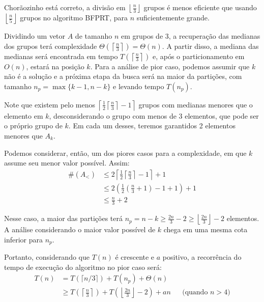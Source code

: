 Chorãozinho está correto, a divisão em $\left\lfloor\frac{n}{3}\right\rfloor$ grupos é menos eficiente que usando $\left\lfloor\frac{n}{5}\right\rfloor$ grupos no algoritmo BFPRT, para $n$ suficientemente grande.

\itemdsep{}

Dividindo um vetor $A$ de tamanho $n$ em grupos de 3, a recuperação das medianas dos grupos terá complexidade $\Theta(\left\lceil\frac{n}{3}\right\rceil) = \Theta(n)$. A partir disso, a mediana das medianas será encontrada em tempo $T(\left\lceil\frac{n}{3}\right\rceil)$ e, após o particionamento em $O(n)$, estará na posição $k$. Para a análise de pior caso, podemos assumir que $k$ não é a solução e a próxima etapa da busca será na maior da partições, com tamanho $n_p = \max\{k - 1, n - k\}$ e levando tempo $T(n_p)$.

Note que existem pelo menos $\left\lceil \frac{1}{2} \left\lceil \frac{n}{3} \right\rceil - 1 \right\rceil$ grupos com medianas menores que o elemento em $k$, desconsiderando o grupo com menos de 3 elementos, que pode ser o próprio grupo de $k$. Em cada um desses, teremos garantidos 2 elementos menores que $A_k$.

Podemos considerar, então, um dos piores casos para a complexidade, em que $k$ assume seu menor valor possível. Assim:
\begin{align*}
    \#\left(A_<\right)
    &\leq 2 \left\lceil \frac{1}{2} \left\lceil \frac{n}{3} \right\rceil - 1 \right\rceil + 1 \\
    &\leq 2 \left(\frac{1}{2} \left(\frac{n}{3} + 1\right) - 1 + 1\right) + 1\\
    &\leq \frac{n}{3} + 2
\end{align*}

Nesse caso, a maior das partições terá $n_p = n - k \geq \frac{2n}{3} - 2 \geq \left\lfloor\frac{2n}{3}\right\rfloor - 2$ elementos. A análise considerando o maior valor possível de $k$ chega em uma mesma cota inferior para $n_p$.

Portanto, considerando que $T(n)$ é crescente e $a$ positivo, a recorrência do tempo de execução do algoritmo no pior caso será:
\begin{align*}
    T(n)
    &= T(\lceil n / 3 \rceil) + T(n_p) + \Theta(n) \\
    &\geq T\left(\left\lceil \frac{n}{3} \right\rceil\right) + T\left(\left\lfloor\frac{2n}{3}\right\rfloor - 2\right) + a n && \text{(quando $n > 4$)}
\end{align*}

